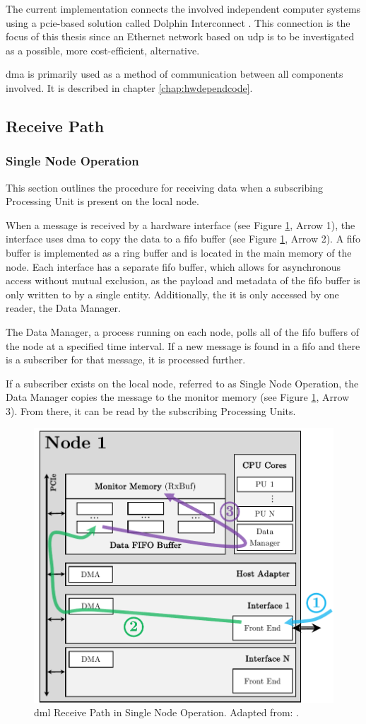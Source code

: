 The current implementation connects the involved independent computer systems using a \ac{pcie}-based solution called Dolphin Interconnect \cite{add01, dml01}. This connection is the focus of this thesis since an Ethernet network based on \ac{udp} is to be investigated as a possible, more cost-efficient, alternative.

\ac{dma} is primarily used as a method of communication between all components involved. It is described in chapter \ref{chap:hwdependcode}.

\subsection{Receive Path}

\subsubsection{Single Node Operation}
This section outlines the procedure for receiving data when a subscribing Processing Unit is present on the local node.

When a message is received by a hardware interface (see Figure \ref{fig:DmlRecSingleNode}, Arrow 1), the interface uses \ac{dma} to copy the data to a \ac{fifo} buffer (see Figure \ref{fig:DmlRecSingleNode}, Arrow 2). A \ac{fifo} buffer is implemented as a ring buffer and is located in the main memory of the node. Each interface has a separate \ac{fifo} buffer, which allows for asynchronous access without mutual exclusion, as the payload and metadata of the \ac{fifo} buffer is only written to by a single entity. Additionally, the it is only accessed by one reader, the Data Manager.

The Data Manager, a process running on each node, polls all of the \ac{fifo} buffers of the node at a specified time interval. If a new message is found in a \ac{fifo} and there is a subscriber for that message, it is processed further.

If a subscriber exists on the local node, referred to as Single Node Operation, the Data Manager copies the message to the monitor memory (see Figure \ref{fig:DmlRecSingleNode}, Arrow 3). From there, it can be read by the subscribing Processing Units. \\

\begin{figure}[h!]
    \centering
    \includegraphics[width=0.48\linewidth]{figures/dml/dml02a.pdf}
    \caption[DML Receive Path in Single Node Operation]{\ac{dml} Receive Path in Single Node Operation. Adapted from: \cite{dml01}.}
    \label{fig:DmlRecSingleNode}
\end{figure}

